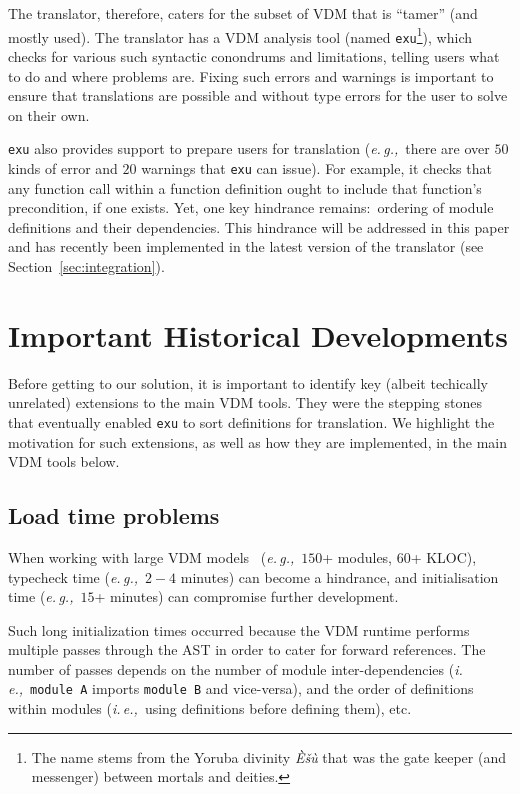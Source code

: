 \documentclass[runningheads,a4paper]{llncs}
\newcommand{\eg}{{\em e.\,g.,\/}}
\newcommand{\ie}{{\em i.\,e.,\/}}
\begin{document}
The translator, therefore, caters for the subset of VDM that is ``tamer'' (and mostly used). The translator has a VDM analysis tool (named \texttt{exu}\footnote{The name stems from the Yoruba divinity \textit{\`{E}\v{s}\`{u}} that was the gate keeper (and messenger) between mortals and deities.}), which checks for various such syntactic conondrums and limitations, telling users what to do and where problems are. Fixing such errors and warnings is important to ensure that translations are possible and without type errors for the user to solve on their own.  

\texttt{exu} also provides support to prepare users for translation (\eg~there are over \(50\) kinds of error and \(20\) warnings that \texttt{exu} can issue). For example, it checks that any function call within a function definition ought to include that function's precondition, if one exists. Yet, one key hindrance remains:~ordering of module definitions and their dependencies. This hindrance will be addressed in this paper and has recently been implemented in the latest version of the translator (see Section~\ref{sec:integration}). 


\section{Important Historical Developments}\label{sec:history}

Before getting to our solution, it is important to identify key (albeit techically unrelated) extensions to the main VDM tools. They were the stepping stones that eventually enabled \texttt{exu} to sort definitions for translation. We highlight the motivation for such extensions, as well as how they are implemented, in the main VDM tools below.

\subsection{Load time problems}

When working with large VDM models~\cite{emv2} (\eg~\(150\)+ modules, \(60\)+ KLOC), typecheck time (\eg~\(2-4\) minutes) can become a hindrance, and initialisation time (\eg~\(15\)+ minutes) can compromise further development. 

Such long initialization times occurred because the VDM runtime performs multiple passes through the AST in order to cater for forward references. The number of passes depends on the number of module inter-dependencies (\ie~\texttt{module A} imports \texttt{module B} and vice-versa), and the order of definitions within modules (\ie~using definitions before defining them), etc. 
\end{document}
